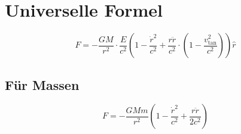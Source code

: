 \section{Universelle Formel}
\[ F = -\frac{GM}{r^2} \cdot \frac{E}{c^2} \left(1 - \frac{\dot{r}^2}{c^2} + \frac{r \ddot{r}}{c^2} \cdot \left(1 - \frac{v_{\text{tan}}^2}{c^2}\right) \right) \hat{r} \]

\subsection*{Für Massen}
\[ F = -\frac{GMm}{r^2} \left(1 - \frac{\dot{r}^2}{c^2} + \frac{r \ddot{r}}{2c^2}\right) \]